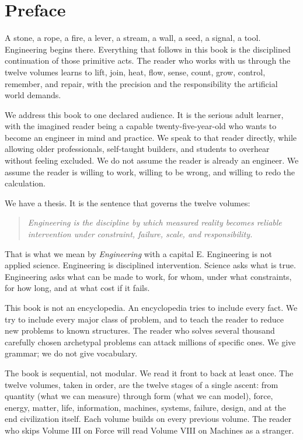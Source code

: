 \chapter*{Preface}
\label{frontmatter:preface}

A stone, a rope, a fire, a lever, a stream, a wall, a seed, a signal, a tool. Engineering begins there. Everything that follows in this book is the disciplined continuation of those primitive acts. The reader who works with us through the twelve volumes learns to lift, join, heat, flow, sense, count, grow, control, remember, and repair, with the precision and the responsibility the artificial world demands.

We address this book to one declared audience. It is the serious adult learner, with the imagined reader being a capable twenty-five-year-old who wants to become an engineer in mind and practice. We speak to that reader directly, while allowing older professionals, self-taught builders, and students to overhear without feeling excluded. We do not assume the reader is already an engineer. We assume the reader is willing to work, willing to be wrong, and willing to redo the calculation.

We have a thesis. It is the sentence that governs the twelve volumes:

\begin{quote}\itshape
Engineering is the discipline by which measured reality becomes reliable intervention under constraint, failure, scale, and responsibility.
\end{quote}

That is what we mean by \emph{Engineering} with a capital E. Engineering is not applied science. Engineering is disciplined intervention. Science asks what is true. Engineering asks what can be made to work, for whom, under what constraints, for how long, and at what cost if it fails.

This book is not an encyclopedia. An encyclopedia tries to include every fact. We try to include every major class of problem, and to teach the reader to reduce new problems to known structures. The reader who solves several thousand carefully chosen archetypal problems can attack millions of specific ones. We give grammar; we do not give vocabulary.

The book is sequential, not modular. We read it front to back at least once. The twelve volumes, taken in order, are the twelve stages of a single ascent: from quantity (what we can measure) through form (what we can model), force, energy, matter, life, information, machines, systems, failure, design, and at the end civilization itself. Each volume builds on every previous volume. The reader who skips Volume III on Force will read Volume VIII on Machines as a stranger.

